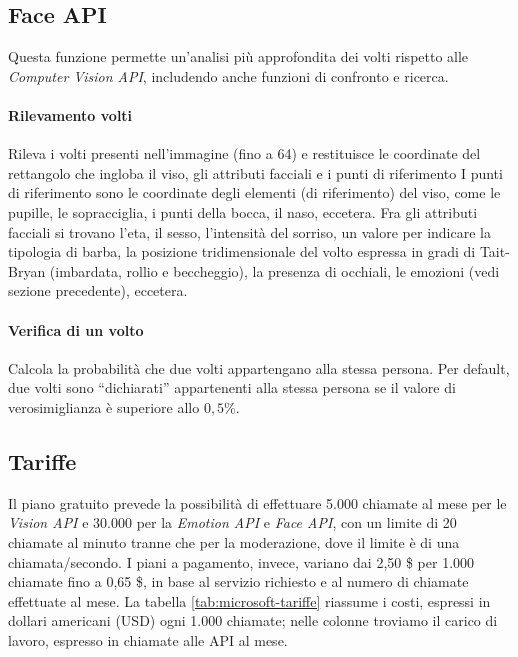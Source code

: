 \subsection{Face API}
Questa funzione permette un'analisi più approfondita dei volti rispetto alle \textit{Computer Vision API}, includendo anche funzioni di confronto e ricerca.

\paragraph{Rilevamento volti} Rileva i volti presenti nell'immagine (fino a 64) e restituisce le coordinate del rettangolo che ingloba il viso, gli attributi facciali
e i punti di riferimento
I punti di riferimento sono le coordinate degli elementi (di riferimento) del viso, come le pupille, le sopracciglia, i punti della bocca, il naso, eccetera.
Fra gli attributi facciali si trovano l'eta, il sesso, l'intensità del sorriso, un valore per indicare la tipologia di barba, la posizione tridimensionale del volto
espressa in gradi di Tait-Bryan (imbardata, rollio e beccheggio), la presenza di occhiali, le emozioni (vedi sezione precedente), eccetera.

\paragraph{Verifica di un volto} Calcola la probabilità che due volti appartengano alla stessa persona.
Per default, due volti sono ``dichiarati'' appartenenti alla stessa persona se il valore di verosimiglianza è superiore allo $0,5\%$.

%
%
\subsection{Tariffe}
Il piano gratuito prevede la possibilità di effettuare 5.000 chiamate al mese per le \textit{Vision API} e 30.000 per la \textit{Emotion API} e \textit{Face API}, con un limite di 20 chiamate al minuto tranne che per la moderazione, dove il limite è di una chiamata/secondo.
I piani a pagamento, invece, variano dai 2,50 \$ per 1.000 chiamate fino a 0,65 \$, in base al servizio richiesto e al numero di chiamate effettuate al mese.
La tabella \ref{tab:microsoft-tariffe} riassume i costi, espressi in dollari americani (USD) ogni 1.000 chiamate; nelle colonne troviamo il carico di lavoro, espresso in chiamate alle API al mese.

